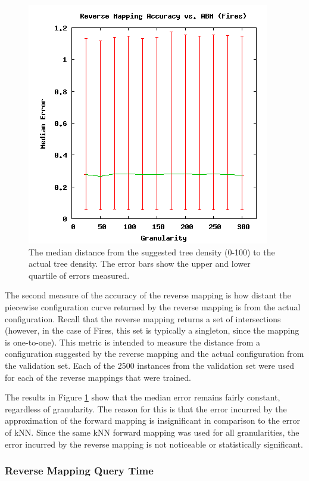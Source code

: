 \begin{figure}[ht]
\centering
\includegraphics[scale=.5]{images/results_fires/rmaccabm.png}
\caption{The median distance from the suggested tree density (0-100) to the actual tree density.
The error bars show the upper and lower quartile of errors measured.}
\label{fig:rmaccabm}
\end{figure}
The second measure of the accuracy of the reverse mapping is how distant the piecewise configuration curve returned by the reverse mapping is from the actual configuration.
Recall that the reverse mapping returns a set of intersections (however, in the case of Fires, this set is typically a singleton, since the mapping is one-to-one).
This metric is intended to measure the distance from a configuration suggested by the reverse mapping and the actual configuration from the validation set.
Each of the 2500 instances from the validation set were used for each of the reverse mappings that were trained.

The results in Figure \ref{fig:rmaccabm} show that the median error remains fairly constant, regardless of granularity.
The reason for this is that the error incurred by the approximation of the forward mapping is insignificant in comparison to the error of kNN.
Since the same kNN forward mapping was used for all granularities, the error incurred by the reverse mapping is not noticeable or statistically significant.


\subsubsection{Reverse Mapping Query Time}

